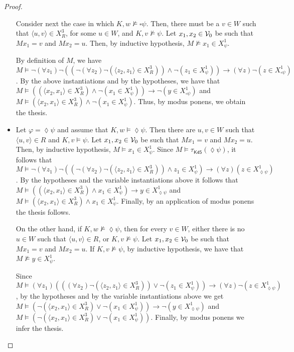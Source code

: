 \documentclass{fundam}
\renewcommand{\And}{\wedge}
\newcommand{\Or}{\vee}
\newcommand{\Kr}{\mathit{K}}
\newcommand{\Kqc}{\mathsf{K45}}
\newcommand{\TKqc}{\tau_{\Kqc}}
\begin{document}
\begin{proof}
\begin{itemize}
Consider next the case in which $\Kr,w \not\models \square \psi$.
Then, there must be a $v \in W$ such that $\langle u,v \rangle\in
X_R^{3}$, for some $u \in W$, and $\Kr,v \not\models \psi$.  Let
$x_1,x_2 \in {\cal V}_0$ be such that $Mx_1 = v$ and $Mx_2 = u$.
Then, by inductive hypothesis, $M \not\models x_1 \in X_{\psi}^{1}$.

By definition of $M$, we have $M \models \neg (\forall z_1)\neg
((\neg(\forall z_2)\neg (\langle z_2,z_1\rangle\in X_R^{3})) \And
\neg(z_1 \in X_{\psi}^{1})) \rightarrow (\forall z)\neg (z \in
X_{\square \psi}^{1})$.  By the above instantiations and by the
hypotheses, we have that $M \models ((\langle x_2,x_1\rangle\in X_R^{3})
\And \neg(x_1 \in X_{\psi}^{1}))\rightarrow \neg(y \in
X_{\square\psi}^{1})$ and $M \models (\langle x_2,x_1\rangle\in
X_R^{3}) \And \neg(x_1 \in X_{\psi}^{1})$.  Thus, by modus ponens, we
obtain the thesis.

\item Let $\varphi = \lozenge \psi$ and assume that $\Kr,w \models
\lozenge \psi$.  Then there are $u,v \in W$ such that $\langle u,v
\rangle\in R$ and $\Kr,v \models \psi$.  Let $x_1,x_2 \in {\cal V}_0$
be such that $Mx_1 = v$ and $Mx_2 = u$.  Then, by inductive
hypothesis, $M \models x_1 \in X_{\psi}^{1}$.  Since $M \models
\TKqc(\lozenge \psi)$, it follows that $M \models \neg (\forall
z_1)\neg ((\neg(\forall z_2)\neg(\langle z_2,z_1\rangle \in X_R^{3}))
\And z_1 \in X_{\psi}^{1})\rightarrow (\forall z)(z \in X_{\lozenge
\psi}^{1})$.  By the hypotheses and the variable instantiations above
it follows that $M \models ((\langle x_2,x_1\rangle \in X_R^{3}) \And
x_1 \in X_{\psi}^{1}) \rightarrow y \in X_{\lozenge\psi}^{1}$ and $M
\models (\langle x_2,x_1\rangle \in X_R^{3}) \And x_1 \in X_{\psi}^{1}$.
Finally, by an application of modus ponens the thesis follows.

On the other hand, if $\Kr,w \not\models \lozenge \psi$, then for
every $v \in W$, either there is no $u \in W$ such that $\langle u,v
\rangle\in R$, or $\Kr,v \not\models \psi$.  Let $x_1,x_2 \in {\cal
V}_0$ be such that $Mx_1 = v$ and $Mx_2 = u$.  If $\Kr,v \not\models
\psi$, by inductive hypothesis, we have that $M \not\models y \in
X_{\psi}^{1}$.

Since $M \models (\forall z_1) (((\forall z_2)\neg (\langle
z_2,z_1\rangle \in X_R^{3})) \Or \neg(z_1 \in X_{\psi}^{1}))\rightarrow
(\forall z)\neg(z \in X_{\lozenge \psi}^{1})$, by the hypotheses and
by the variable instantiations above we get $M \models (\neg (\langle
x_2,x_1\rangle \in X_R^{3}) \Or \neg( x_1 \in X_{\psi}^{1})) \rightarrow
\neg (y \in X_{\lozenge\psi}^{1})$ and $M \models (\neg(\langle
x_2,x_1\rangle \in X_R^{3}) \Or \neg( x_1 \in X_{\psi}^{1}))$.  Finally,
by modus ponens we infer the thesis.
\end{itemize}
\end{proof}
\end{document}
